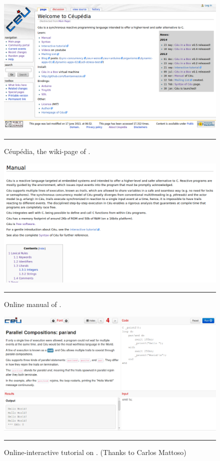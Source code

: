 \begin{figure}[t]
\centering
\includegraphics[scale=0.37]{wiki.png}
\rule{14cm}{0.37pt}
\caption{ C\'eup\'edia, the wiki-page of \CEU.
\label{fig.wiki}
}
\end{figure}

\begin{figure}[t]
\centering
\includegraphics[scale=0.35]{manual.png}
\rule{14cm}{0.45pt}
\caption{ Online manual of \CEU.
\label{fig.wiki}
}
\end{figure}

\begin{figure}[t]
\centering
\includegraphics[scale=0.35]{tutorial.png}
\rule{14cm}{0.37pt}
\caption{ Online-interactive tutorial on \CEU. (Thanks to Carlos Mattoso)
\label{fig.tutorial}
}
\end{figure}

